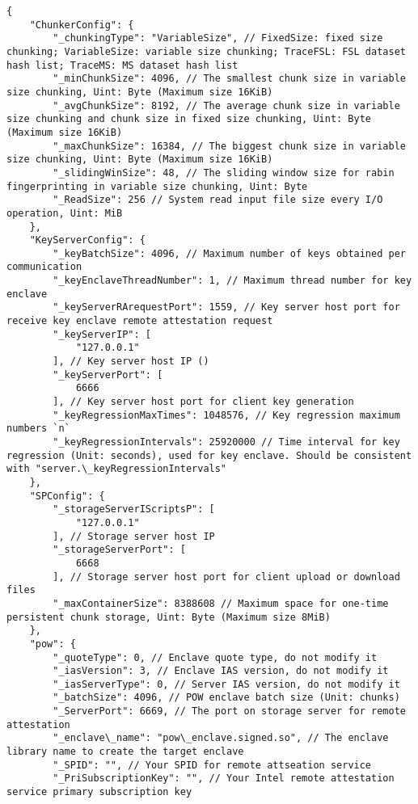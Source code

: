 \begin{lstlisting}[style=json]
{
    "ChunkerConfig": {
        "_chunkingType": "VariableSize", // FixedSize: fixed size chunking; VariableSize: variable size chunking; TraceFSL: FSL dataset hash list; TraceMS: MS dataset hash list
        "_minChunkSize": 4096, // The smallest chunk size in variable size chunking, Uint: Byte (Maximum size 16KiB)
        "_avgChunkSize": 8192, // The average chunk size in variable size chunking and chunk size in fixed size chunking, Uint: Byte (Maximum size 16KiB)
        "_maxChunkSize": 16384, // The biggest chunk size in variable size chunking, Uint: Byte (Maximum size 16KiB)
        "_slidingWinSize": 48, // The sliding window size for rabin fingerprinting in variable size chunking, Uint: Byte
        "_ReadSize": 256 // System read input file size every I/O operation, Uint: MiB
    },
    "KeyServerConfig": {
        "_keyBatchSize": 4096, // Maximum number of keys obtained per communication
        "_keyEnclaveThreadNumber": 1, // Maximum thread number for key enclave
        "_keyServerRArequestPort": 1559, // Key server host port for receive key enclave remote attestation request
        "_keyServerIP": [
            "127.0.0.1"
        ], // Key server host IP ()
        "_keyServerPort": [
            6666
        ], // Key server host port for client key generation
        "_keyRegressionMaxTimes": 1048576, // Key regression maximum numbers `n`
        "_keyRegressionIntervals": 25920000 // Time interval for key regression (Unit: seconds), used for key enclave. Should be consistent with "server.\_keyRegressionIntervals"
    },
    "SPConfig": {
        "_storageServerIScriptsP": [
            "127.0.0.1"
        ], // Storage server host IP
        "_storageServerPort": [
            6668
        ], // Storage server host port for client upload or download files
        "_maxContainerSize": 8388608 // Maximum space for one-time persistent chunk storage, Uint: Byte (Maximum size 8MiB)
    },
    "pow": {
        "_quoteType": 0, // Enclave quote type, do not modify it
        "_iasVersion": 3, // Enclave IAS version, do not modify it
        "_iasServerType": 0, // Server IAS version, do not modify it
        "_batchSize": 4096, // POW enclave batch size (Unit: chunks)
        "_ServerPort": 6669, // The port on storage server for remote attestation
        "_enclave\_name": "pow\_enclave.signed.so", // The enclave library name to create the target enclave
        "_SPID": "", // Your SPID for remote attseation service
        "_PriSubscriptionKey": "", // Your Intel remote attestation service primary subscription key

\end{lstlisting}
